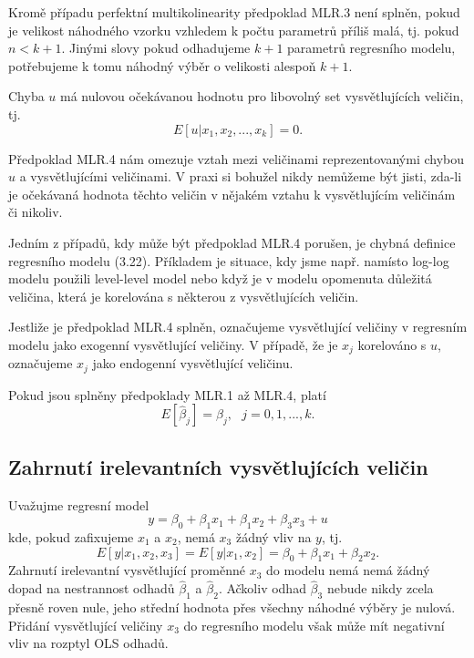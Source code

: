 Kromě případu perfektní multikolinearity předpoklad MLR.3 není splněn, pokud je velikost náhodného vzorku vzhledem k počtu parametrů 
příliš malá, tj. pokud $n < k + 1$. Jinými slovy pokud odhadujeme $k+1$ parametrů regresního modelu, 
potřebujeme k tomu náhodný výběr o velikosti alespoň $k+1$.

\begin{assumption}
Chyba $u$ má nulovou očekávanou hodnotu pro libovolný set vysvětlujících veličin, tj.
\begin{equation}
E[u|x_1, x_2, ..., x_k] = 0.
\end{equation}


\raggedleft{$\clubsuit$}
\end{assumption}

Předpoklad MLR.4 nám omezuje vztah mezi veličinami reprezentovanými chybou $u$ a vysvětlujícími veličinami. V 
praxi si bohužel nikdy nemůžeme být jisti, zda-li je očekávaná hodnota těchto veličin v nějakém vztahu k 
vysvětlujícím veličinám či nikoliv.

Jedním z případů, kdy může být předpoklad MLR.4 porušen, je 
chybná definice regresního modelu (3.22). 
Příkladem je situace, kdy jsme např. namísto log-log modelu 
použili level-level model nebo když je v modelu opomenuta 
důležitá veličina, která je korelována s některou z 
vysvětlujících veličin.

Jestliže je předpoklad MLR.4 splněn, označujeme vysvětlující veličiny v regresním modelu jako exogenní 
vysvětlující veličiny. V případě, že je $x_j$ korelováno s $u$, označujeme $x_j$ jako endogenní vysvětlující veličinu.

\begin{theorem}
Pokud jsou splněny předpoklady MLR.1 až MLR.4, platí
\begin{equation}
E[\hat{\beta}_j] = \beta_j, ~~~ j = 0, 1, ..., k.
\end{equation}

\raggedleft{$\clubsuit$}
\end{theorem}

\subsection{Zahrnutí irelevantních vysvětlujících veličin}

Uvažujme regresní model
\begin{equation}
y = \beta_0 + \beta_1 x_1 + \beta_1 x_2 + \beta_3 x_3 + u
\end{equation}
kde, pokud zafixujeme $x_1$ a $x_2$, nemá $x_3$ žádný vliv na $y$, tj.
\begin{equation}
E[y|x_1, x_2, x_3] = E[y|x_1, x_2] = \beta_0 + \beta_1 x_1 + \beta_2 x_2.
\end{equation}
Zahrnutí irelevantní vysvětlující proměnné $x_3$ do modelu nemá nemá žádný dopad na nestrannost odhadů 
$\hat{\beta}_1$ a $\hat{\beta}_2$. Ačkoliv odhad $\hat{\beta}_3$ nebude nikdy zcela přesně roven nule, jeho 
střední hodnota přes všechny náhodné výběry je nulová. 
Přidání vysvětlující veličiny $x_3$ do regresního modelu však může mít negativní vliv 
na rozptyl OLS odhadů.

